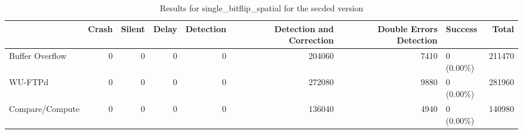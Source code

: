 \begin{table}[t]
	\centering
	\caption{Results for single_bitflip_spatial for the secded version}
	\label{table:end_sim_by_status_secded_4_single_bitflip_spatial}
	\begin{tabular}{lrrrrrrlr}
		\toprule
		                & Crash & Silent & Delay & Detection & Detection and Correction & Double Errors Detection & Success    & Total  \\
		\midrule
		Buffer Overflow & 0     & 0      & 0     & 0         & 204060                   & 7410                    & 0 (0.00\%) & 211470 \\
		WU-FTPd         & 0     & 0      & 0     & 0         & 272080                   & 9880                    & 0 (0.00\%) & 281960 \\
		Compare/Compute & 0     & 0      & 0     & 0         & 136040                   & 4940                    & 0 (0.00\%) & 140980 \\
		\bottomrule
	\end{tabular}
\end{table}
